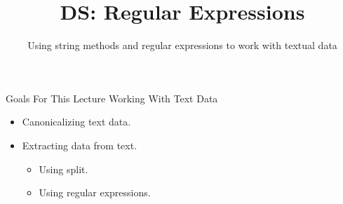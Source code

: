 \documentclass[aspectratio=169]{../latex_main/tntbeamer}  %
\title[Introduction]{DS: Regular Expressions}
\subtitle{Using string methods and regular expressions to work with textual data
}
\begin{document}
	
	\maketitle
	\begin{frame}{Goals For This Lecture}
	    Working With Text Data
\begin{itemize}
    \item Canonicalizing text data.
    \item Extracting data from text.
    \begin{itemize}
        \item Using split.
        \item Using regular expressions.
    \end{itemize}
\end{itemize}
	\end{frame}
	
\end{document}
